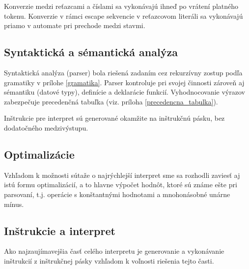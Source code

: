 \documentclass[12pt,a4paper,titlepage,final]{article}
\begin{document}
Konverzie medzi reťazcami a číslami sa vykonávajú ihneď po vrátení platného tokenu.
Konverzie v rámci escape sekvencie v reťazcovom literáli sa vykonávajú
 priamo v automate pri prechode medzi stavmi.

\subsection{Syntaktická a sémantická analýza}
Syntaktická analýza (parser) bola riešená zadaním cez rekurzívny zostup 
 podľa gramatiky v prílohe \ref{gramatika}.
Parser kontroluje pri svojej činnosti zároveň aj sémantiku (datové typy),
definície a deklarácie funkcií.
Vyhodnocovanie výrazov zabezpečuje precedenčná tabuľka 
 (viz. príloha \ref{precedencna_tabulka}).

Inštrukcie pre interpret sú generované okamžite na inštrukčnú pásku,
 bez dodatočného medzivýstupu.

     
     
     
     

\subsection{Optimalizácie}
Vzhľadom k možnosti sútaže o najrýchlejší interpret sme sa rozhodli zaviesť aj
istú formu optimalizácií, a to hlavne výpočet hodnôt, ktoré sú známe ešte pri
parsovaní, t.j. operácie s konštantnými hodnotami a mnohonásobné unárne mínus.

\subsection{Inštrukcie a interpret}
Ako najzaujímavejšia časť celého interpretu je generovanie a vykonávanie inštrukcií
z inštrukčnej pásky vzhľadom k voľnosti riešenia tejto časti.
\end{document}

